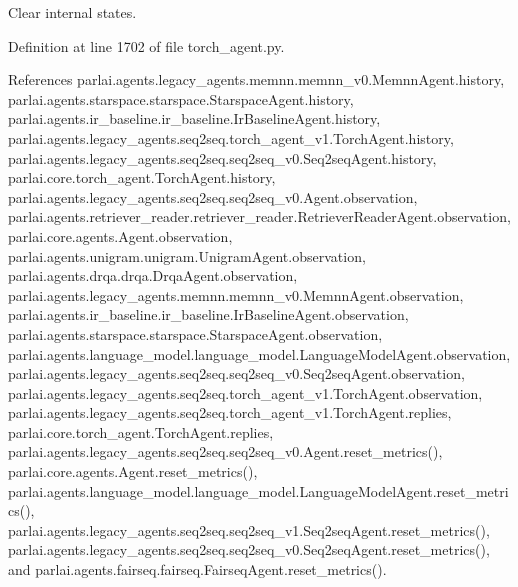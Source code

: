 \begin{DoxyVerb}Clear internal states.\end{DoxyVerb}
 

Definition at line 1702 of file torch\+\_\+agent.\+py.



References parlai.\+agents.\+legacy\+\_\+agents.\+memnn.\+memnn\+\_\+v0.\+Memnn\+Agent.\+history, parlai.\+agents.\+starspace.\+starspace.\+Starspace\+Agent.\+history, parlai.\+agents.\+ir\+\_\+baseline.\+ir\+\_\+baseline.\+Ir\+Baseline\+Agent.\+history, parlai.\+agents.\+legacy\+\_\+agents.\+seq2seq.\+torch\+\_\+agent\+\_\+v1.\+Torch\+Agent.\+history, parlai.\+agents.\+legacy\+\_\+agents.\+seq2seq.\+seq2seq\+\_\+v0.\+Seq2seq\+Agent.\+history, parlai.\+core.\+torch\+\_\+agent.\+Torch\+Agent.\+history, parlai.\+agents.\+legacy\+\_\+agents.\+seq2seq.\+seq2seq\+\_\+v0.\+Agent.\+observation, parlai.\+agents.\+retriever\+\_\+reader.\+retriever\+\_\+reader.\+Retriever\+Reader\+Agent.\+observation, parlai.\+core.\+agents.\+Agent.\+observation, parlai.\+agents.\+unigram.\+unigram.\+Unigram\+Agent.\+observation, parlai.\+agents.\+drqa.\+drqa.\+Drqa\+Agent.\+observation, parlai.\+agents.\+legacy\+\_\+agents.\+memnn.\+memnn\+\_\+v0.\+Memnn\+Agent.\+observation, parlai.\+agents.\+ir\+\_\+baseline.\+ir\+\_\+baseline.\+Ir\+Baseline\+Agent.\+observation, parlai.\+agents.\+starspace.\+starspace.\+Starspace\+Agent.\+observation, parlai.\+agents.\+language\+\_\+model.\+language\+\_\+model.\+Language\+Model\+Agent.\+observation, parlai.\+agents.\+legacy\+\_\+agents.\+seq2seq.\+seq2seq\+\_\+v0.\+Seq2seq\+Agent.\+observation, parlai.\+agents.\+legacy\+\_\+agents.\+seq2seq.\+torch\+\_\+agent\+\_\+v1.\+Torch\+Agent.\+observation, parlai.\+agents.\+legacy\+\_\+agents.\+seq2seq.\+torch\+\_\+agent\+\_\+v1.\+Torch\+Agent.\+replies, parlai.\+core.\+torch\+\_\+agent.\+Torch\+Agent.\+replies, parlai.\+agents.\+legacy\+\_\+agents.\+seq2seq.\+seq2seq\+\_\+v0.\+Agent.\+reset\+\_\+metrics(), parlai.\+core.\+agents.\+Agent.\+reset\+\_\+metrics(), parlai.\+agents.\+language\+\_\+model.\+language\+\_\+model.\+Language\+Model\+Agent.\+reset\+\_\+metrics(), parlai.\+agents.\+legacy\+\_\+agents.\+seq2seq.\+seq2seq\+\_\+v1.\+Seq2seq\+Agent.\+reset\+\_\+metrics(), parlai.\+agents.\+legacy\+\_\+agents.\+seq2seq.\+seq2seq\+\_\+v0.\+Seq2seq\+Agent.\+reset\+\_\+metrics(), and parlai.\+agents.\+fairseq.\+fairseq.\+Fairseq\+Agent.\+reset\+\_\+metrics().

